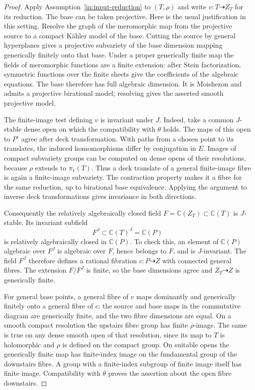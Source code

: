 \begin{proof}
Apply Assumption~\ref{in:input-reduction} to $(T,\rho)$ and write
$v:T\dashrightarrow Z_T$ for its reduction.  The base can be taken
projective.  Here is the usual justification in this setting.  Resolve
the graph of the meromorphic map from the projective source to a
compact K\"ahler model of the base.  Cutting the source by general
hyperplanes gives a projective subvariety of the base dimension mapping
generically finitely onto that base.  Under a proper generically finite
map the fields of meromorphic functions are a finite extension: after
Stein factorization, symmetric functions over the finite sheets give
the coefficients of the algebraic equations.  The base therefore has
full algebraic dimension.  It is Moishezon and admits a projective
birational model; resolving gives the asserted smooth projective model.

The finite-image test defining $v$ is invariant under $J$.  Indeed,
take a common $J$-stable dense open on which the compatibility with
$\theta$ holds.  The maps of this open to $P^\circ$ agree after deck
transformation.  With paths from a chosen point to its translates,
the induced homomorphisms differ by conjugation in $E$.  Images of
compact subvariety groups can be computed on dense opens of their
resolutions, because $\rho$ extends to $\pi_1(T)$.  Thus a deck
translate of a general finite-image fibre is again a finite-image
subvariety.  The contraction property makes it a fibre for the same
reduction, up to birational base equivalence.  Applying the argument
to inverse deck transformations gives invariance in both directions.

Consequently the relatively algebraically closed field
$F=\mathbb C(Z_T)\subset\mathbb C(T)$ is $J$-stable.  Its invariant
subfield
\[
 F^J\subset\mathbb C(T)^J=\mathbb C(P)
\]
is relatively algebraically closed in $\mathbb C(P)$.  To check this,
an element of $\mathbb C(P)$ algebraic over $F^J$ is algebraic over
$F$, hence belongs to $F$, and is $J$-invariant.  The field $F^J$
therefore defines a rational fibration $c:P\dashrightarrow Z$ with
connected general fibres.  The extension $F/F^J$ is finite, so the
base dimensions agree and $Z_T\dashrightarrow Z$ is generically
finite.

For general base points, a general fibre of $v$ maps dominantly and
generically finitely onto a general fibre of $c$: the source and base
maps in the commutative diagram are generically finite, and the two
fibre dimensions are equal.  On a smooth compact resolution the
upstairs fibre group has finite $\rho$-image.  The same is true on
any dense smooth open of that resolution, since its map to $T$ is
holomorphic and $\rho$ is defined on the compact group.  On suitable
opens the generically finite map has finite-index image on the
fundamental group of the downstairs fibre.  A group with a finite-index
subgroup of finite image itself has finite image.  Compatibility with
$\theta$ proves the assertion about the open fibre downstairs.
\end{proof}

